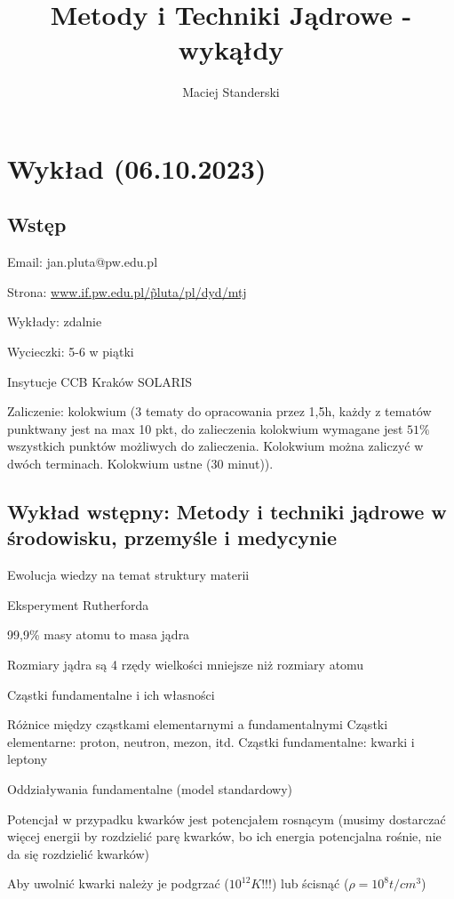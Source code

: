 \documentclass{article}
\title{Metody i Techniki Jądrowe - wykąłdy}
\author{Maciej Standerski}
\begin{document}
\maketitle

\section{Wykład (06.10.2023)}

\subsection{Wstęp}

Email: jan.pluta@pw.edu.pl

Strona: \href{https://www.if.pw.edu.pl/~pluta/pl/dyd/mtj/}{www.if.pw.edu.pl/\~pluta/pl/dyd/mtj}

Wykłady: zdalnie

Wycieczki: 5-6 w piątki

Insytucje
CCB Kraków
SOLARIS

Zaliczenie: kolokwium (3 tematy do opracowania przez 1,5h, każdy z tematów punktwany jest na max 10 pkt, do zalieczenia kolokwium wymagane jest $51\%$ wszystkich punktów możliwych do zalieczenia. Kolokwium można zaliczyć w dwóch terminach. Kolokwium ustne (30 minut)).

\subsection{Wykład wstępny: Metody i techniki jądrowe w środowisku, przemyśle i medycynie}

Ewolucja wiedzy na temat struktury materii

Eksperyment Rutherforda

99,9\% masy atomu to masa jądra

Rozmiary jądra są 4 rzędy wielkości mniejsze niż rozmiary atomu

Cząstki fundamentalne i ich własności

Różnice między cząstkami elementarnymi a fundamentalnymi
Cząstki elementarne: proton, neutron, mezon, itd.
Cząstki fundamentalne: kwarki i leptony

Oddziaływania fundamentalne (model standardowy)

Potencjał w przypadku kwarków jest potencjałem rosnącym (musimy dostarczać więcej energii by rozdzielić parę kwarków, bo ich energia potencjalna rośnie, nie da się rozdzielić kwarków)

Aby uwolnić kwarki należy je podgrzać ($10^{12} K$!!!) lub ścisnąć ($\rho = 10^8 t/cm^3$)
\end{document}
